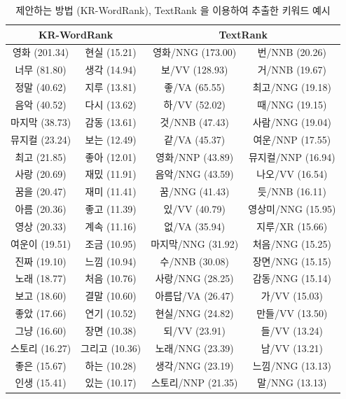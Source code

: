 \documentclass[11pt]{article}
\begin{document}
\begin{table}[H]
\centering
\small
\caption{제안하는 방법 (KR-WordRank), TextRank 을 이용하여 추출한 키워드 예시}
\label{tab:krwordrank_keyword_example}
\begin{tabular}{|c|c|c|c|}
\hline
\multicolumn{2}{|c|}{\textbf{KR-WordRank}} & \multicolumn{2}{c|}{\textbf{TextRank}} \\ \hline
영화 (201.34) & 현실 (15.21) & 영화/NNG (173.00) & 번/NNB (20.26) \\ \hline
너무 (81.80) & 생각 (14.94) & 보/VV (128.93) & 거/NNB (19.67) \\ \hline
정말 (40.62) & 지루 (13.81) & 좋/VA (65.55) & 최고/NNG (19.18) \\ \hline
음악 (40.52) & 다시 (13.62) & 하/VV (52.02) & 때/NNG (19.15) \\ \hline
마지막 (38.73) & 감동 (13.61) & 것/NNB (47.43) & 사람/NNG (19.04) \\ \hline
뮤지컬 (23.24) & 보는 (12.49) & 같/VA (45.37) & 여운/NNP (17.55) \\ \hline
최고 (21.85) & 좋아 (12.01) & 영화/NNP (43.89) & 뮤지컬/NNP (16.94) \\ \hline
사랑 (20.69) & 재밌 (11.91) & 음악/NNG (43.59) & 나오/VV (16.54) \\ \hline
꿈을 (20.47) & 재미 (11.41) & 꿈/NNG (41.43) & 듯/NNB (16.11) \\ \hline
아름 (20.36) & 좋고 (11.39) & 있/VV (40.79) & 영상미/NNG (15.95) \\ \hline
영상 (20.33) & 계속 (11.16) & 없/VA (35.94) & 지루/XR (15.66) \\ \hline
여운이 (19.51) & 조금 (10.95) & 마지막/NNG (31.92) & 처음/NNG (15.25) \\ \hline
진짜 (19.10) & 느낌 (10.94) & 수/NNB (30.08) & 장면/NNG (15.15) \\ \hline
노래 (18.77) & 처음 (10.76) & 사랑/NNG (28.25) & 감동/NNG (15.14) \\ \hline
보고 (18.60) & 결말 (10.60) & 아름답/VA (26.47) & 가/VV (15.03) \\ \hline
좋았 (17.66) & 연기 (10.52) & 현실/NNG (24.82) & 만들/VV (13.50) \\ \hline
그냥 (16.60) & 장면 (10.38) & 되/VV (23.91) & 들/VV (13.24) \\ \hline
스토리 (16.27) & 그리고 (10.36) & 노래/NNG (23.39) & 남/VV (13.21) \\ \hline
좋은 (15.67) & 하는 (10.28) & 생각/NNG (23.19) & 느낌/NNG (13.13) \\ \hline
인생 (15.41) & 있는 (10.17) & 스토리/NNP (21.35) & 말/NNG (13.13) \\ \hline
\end{tabular}
\end{table}
\end{document}

